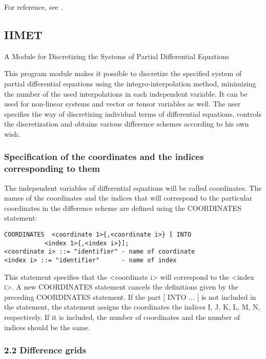 For reference, see \cite{WirthPhD1980}.




\subsection{IIMET}



                 A Module for Discretizing the Systems
                   of Partial Differential Equations



     This program module makes it possible  to discretize  the specified
system of partial differential equations using the integro-interpolation
method,  minimizing  the  number  of  the  used  interpolations  in each
independent variable.  It can  be used for non-linear systems and vector
or tensor variables as well.  The user specifies the way of discretizing
individual terms  of differential equations, controls the discretization
and obtains various difference schemes according to his own wish.


\subsubsection{Specification of the coordinates and the indices corresponding to them}

     The independent variables of differential equations  will be called
coordinates.  The  names  of  the  coordinates and the indices that will
correspond to the particular  coordinates in  the difference  scheme are
defined using the COORDINATES statement:
\begin{verbatim}
COORDINATES  <coordinate 1>{,<coordinate i>} [ INTO
           <index 1>{,<index i>}];
<coordinate i> ::= "identifier" - name of coordinate
<index i> ::= "identifier"      - name of index
\end{verbatim}
This statement  specifies that the <coordinate i> will correspond to the
<index i>. A new COORDINATES statement cancels the  definitions given by
the preceding  COORDINATES statement.  If the  part [  INTO ... ] is not
included in the statement, the  statement  assigns  the  coordinates the
indices I, J, K, L, M, N, respectively. If it is included, the number of
coordinates and the number of indices should be the same.



\subsubsection{2.2 Difference grids}


